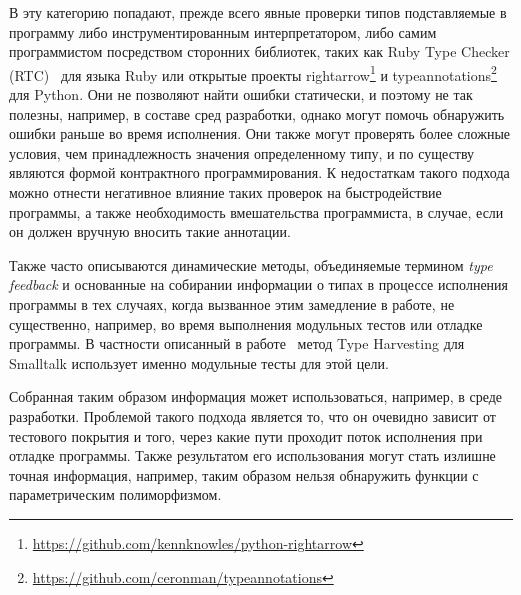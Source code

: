 В эту категорию попадают, прежде всего явные проверки типов подставляемые в
программу либо инструментированным интерпретатором, либо самим программистом
посредством сторонних библиотек, таких как Ruby Type Checker (RTC)~\cite{Ren2013}
для языка Ruby или открытые проекты
rightarrow\footnote{\url{https://github.com/kennknowles/python-rightarrow}} и
typeannotations\footnote{\url{https://github.com/ceronman/typeannotations}} для
Python.  Они не позволяют найти ошибки статически, и поэтому не так полезны,
например, в составе
сред разработки, однако могут помочь обнаружить ошибки раньше во время
исполнения.  Они также могут проверять более сложные условия, чем принадлежность
значения определенному типу, и по существу являются формой контрактного
программирования.  К недостаткам такого подхода можно отнести негативное влияние
таких проверок на быстродействие программы, а также необходимость вмешательства
программиста, в случае, если он должен вручную вносить такие аннотации. 

Также часто описываются динамические методы, объединяемые термином \emph{type
  feedback} и основанные на собирании информации о типах в процессе исполнения
программы в тех случаях, когда вызванное этим замедление в работе, не
существенно, например, во время выполнения модульных тестов или отладке
программы. В частности описанный в работе~\cite{Haupt2011} метод Type Harvesting
для Smalltalk использует именно модульные тесты для этой цели.

Собранная таким образом информация может использоваться, например, в среде
разработки.  Проблемой такого подхода является то, что он очевидно зависит от
тестового покрытия и того, через какие пути проходит поток исполнения при
отладке программы. Также результатом его использования могут стать излишне
точная информация, например, таким образом нельзя обнаружить функции с
параметрическим полиморфизмом.
